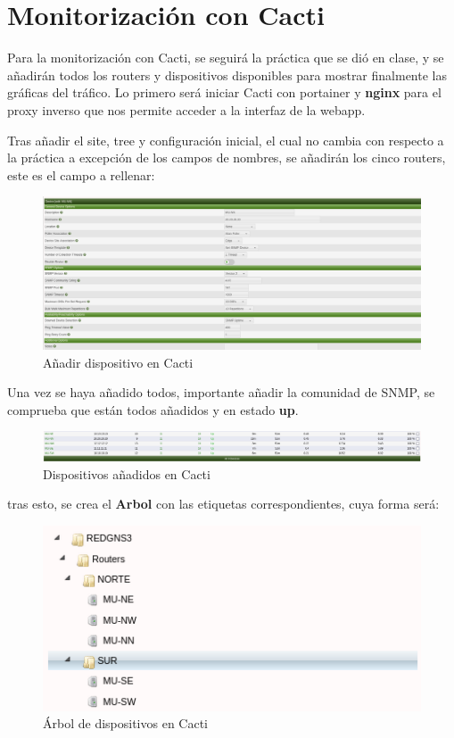 \documentclass[11pt]{article}
\begin{document}
\section{Monitorización con Cacti}

Para la monitorización con Cacti, se seguirá la práctica que se dió en clase, y se añadirán todos los routers y dispositivos disponibles para mostrar finalmente las gráficas del tráfico. Lo primero será iniciar Cacti con portainer y \textbf{nginx} para el proxy inverso que nos permite acceder a la interfaz de la webapp.

Tras añadir el site, tree y configuración inicial, el cual no cambia con respecto a la práctica a excepción de los campos de nombres, se añadirán los cinco routers, este es el campo a rellenar:

\begin{figure}[h]
    \centering
    \includegraphics[width=\textwidth]{src/adddevices.png}
    \caption{Añadir dispositivo en Cacti}
\end{figure}

Una vez se haya añadido todos, importante añadir la comunidad de SNMP, se comprueba que están todos añadidos y en estado \textbf{up}.

\begin{figure}[h]
    \centering
    \includegraphics[width=\textwidth]{src/devices.png}
    \caption{Dispositivos añadidos en Cacti}
\end{figure}

tras esto, se crea el \textbf{Arbol} con las etiquetas correspondientes, cuya forma será:

\begin{figure}[h]
    \centering
    \includegraphics[width=\textwidth]{src/cactree.png}
    \caption{Árbol de dispositivos en Cacti}
\end{figure}
\end{document}
